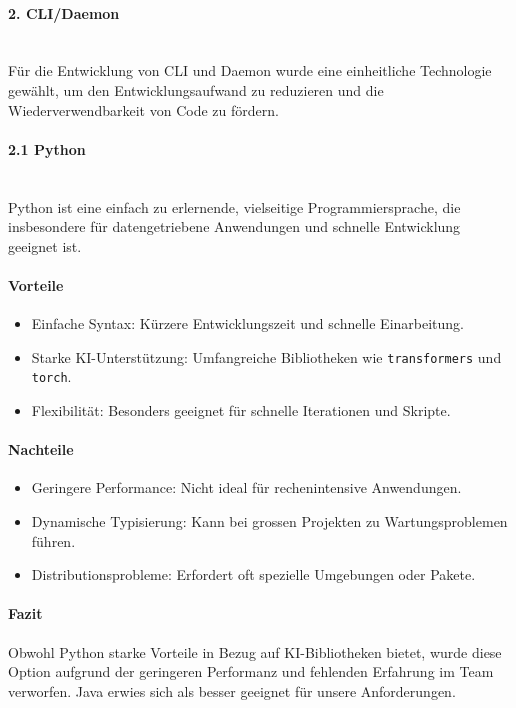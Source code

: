 \documentclass[a4paper,12pt]{report}
\begin{document}
    \paragraph*{2. CLI/Daemon}\mbox{}\\
    Für die Entwicklung von CLI und Daemon wurde eine einheitliche Technologie gewählt, um den Entwicklungsaufwand zu reduzieren und die Wiederverwendbarkeit von Code zu fördern.

    \paragraph*{2.1 Python}\mbox{}\\
    Python ist eine einfach zu erlernende, vielseitige Programmiersprache, die insbesondere für datengetriebene Anwendungen und schnelle Entwicklung geeignet ist.

    \paragraph*{Vorteile}
    \begin{itemize}
        \item Einfache Syntax: Kürzere Entwicklungszeit und schnelle Einarbeitung.
        \item Starke KI-Unterstützung: Umfangreiche Bibliotheken wie \texttt{transformers} und \texttt{torch}.
        \item Flexibilität: Besonders geeignet für schnelle Iterationen und Skripte.
    \end{itemize}

    \paragraph*{Nachteile}
    \begin{itemize}
        \item Geringere Performance: Nicht ideal für rechenintensive Anwendungen.
        \item Dynamische Typisierung: Kann bei grossen Projekten zu Wartungsproblemen führen.
        \item Distributionsprobleme: Erfordert oft spezielle Umgebungen oder Pakete.
    \end{itemize}

    \paragraph*{Fazit}
    Obwohl Python starke Vorteile in Bezug auf KI-Bibliotheken bietet, wurde diese Option aufgrund der geringeren Performanz und fehlenden Erfahrung im Team verworfen.
    Java erwies sich als besser geeignet für unsere Anforderungen.
\end{document}
